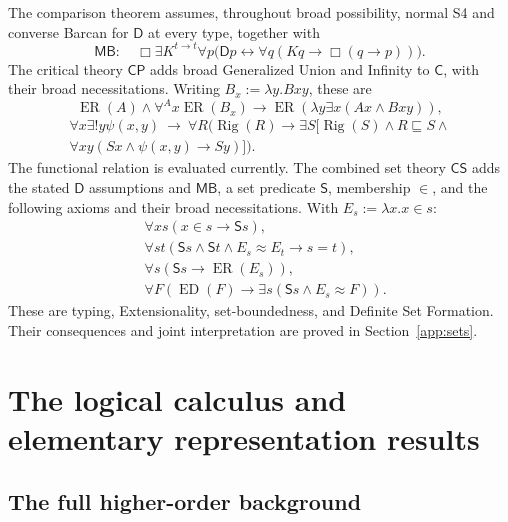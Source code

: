 \documentclass[11pt]{article}
\theoremstyle{definition}
\newcommand{\D}{\mathsf D}
\newcommand{\Rig}{\operatorname{Rig}}
\newcommand{\ED}{\operatorname{ED}}
\newcommand{\ER}{\operatorname{ER}}
\newcommand{\C}{\mathsf C}
\newcommand{\rel}{\mathbin{\approx}}
\newcommand{\sub}{\mathbin{\sqsubseteq}}
\numberwithin{equation}{section}
\begin{document}
The comparison theorem assumes, throughout broad possibility, normal S4 and converse Barcan for $\D$ at every type, together with
\[
\mathsf{MB}:\quad\Box\exists K^{t\to t}\forall p
\bigl(\D p\leftrightarrow\forall q(Kq\rightarrow\Box(q\rightarrow p))\bigr).
\]
The critical theory $\mathsf{CP}$ adds broad Generalized Union and Infinity to $\C$, with their broad necessitations. Writing $B_x:=\lambda y.Bxy$, these are
\[
\ER(A)\wedge\forall^A x\ER(B_x)\rightarrow
\ER(\lambda y\exists x(Ax\wedge Bxy)),
\]
\[
\begin{aligned}
\forall x\exists!y\psi(x,y)\ \longrightarrow\
\forall R\bigl(\Rig(R)\rightarrow\exists S[\Rig(S)\wedge R\sub S\wedge{}\\
\forall xy(Sx\wedge\psi(x,y)\rightarrow Sy)]\bigr).
\end{aligned}
\]
The functional relation is evaluated currently. The combined set theory $\mathsf{CS}$ adds the stated $\D$ assumptions and $\mathsf{MB}$, a set predicate $\mathsf S$, membership $\in$, and the following axioms and their broad necessitations. With $E_s:=\lambda x.x\in s$:
\begin{align*}
&\forall xs(x\in s\rightarrow\mathsf Ss),\\
&\forall st(\mathsf Ss\wedge\mathsf St\wedge E_s\rel E_t\rightarrow s=t),\\
&\forall s(\mathsf Ss\rightarrow\ER(E_s)),\\
&\forall F(\ED(F)\rightarrow\exists s(\mathsf Ss\wedge E_s\rel F)).
\end{align*}
These are typing, Extensionality, set-boundedness, and Definite Set Formation. Their consequences and joint interpretation are proved in Section~\ref{app:sets}.
\clearpage
\appendix

\section{The logical calculus and elementary representation results}\label{app:logic}

\subsection{The full higher-order background}
\end{document}
